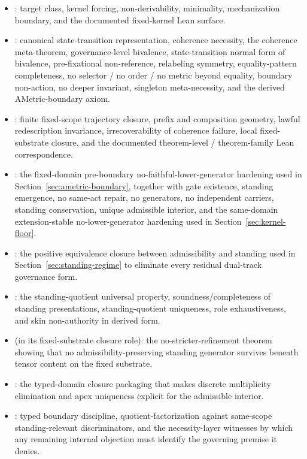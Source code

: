 \begin{itemize}
  \item \fcas{}: target class, kernel forcing, non-derivability, minimality, mechanization boundary, and the documented fixed-kernel Lean surface.
  \item \ametric{}: canonical state-transition representation, coherence necessity, the coherence meta-theorem, governance-level bivalence, state-transition normal form of bivalence, pre-fixational non-reference, relabeling symmetry, equality-pattern completeness, no selector / no order / no metric beyond equality, boundary non-action, no deeper invariant, singleton meta-necessity, and the derived AMetric-boundary axiom.
  \item \trajpaper{}: finite fixed-scope trajectory closure, prefix and composition geometry, lawful redescription invariance, irrecoverability of coherence failure, local fixed-substrate closure, and the documented theorem-level / theorem-family Lean correspondence.
  \item \necessitydoc{}: the fixed-domain pre-boundary no-faithful-lower-generator hardening used in Section~\ref{sec:ametric-boundary}, together with gate existence, standing emergence, no same-act repair, no generators, no independent carriers, standing conservation, unique admissible interior, and the same-domain extension-stable no-lower-generator hardening used in Section~\ref{sec:kernel-floor}.
  \item \standeqdoc{}: the positive equivalence closure between admissibility and standing used in Section~\ref{sec:standing-regime} to eliminate every residual dual-track governance form.
  \item \atsdoc{}: the standing-quotient universal property, soundness/completeness of standing presentations, standing-quotient uniqueness, role exhaustiveness, and skin non-authority in derived form.
  \item \trajpaper{} (in its fixed-substrate closure role): the no-stricter-refinement theorem showing that no admissibility-preserving standing generator survives beneath tensor content on the fixed substrate.
  \item \unusdoc{}: the typed-domain closure packaging that makes discrete multiplicity elimination and apex uniqueness explicit for the admissible interior.
  \item \exhaustiondoc{}: typed boundary discipline, quotient-factorization against same-scope standing-relevant discriminators, and the necessity-layer witnesses by which any remaining internal objection must identify the governing premise it denies.

\end{itemize}
